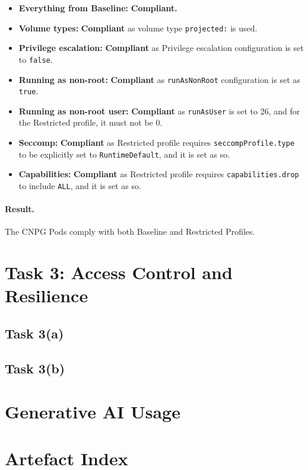 \documentclass[11pt,a4paper]{article}
\begin{document}
	\begin{itemize}
		\item \textbf{Everything from Baseline:} \textbf{Compliant.}

		\item \textbf{Volume types:} \textbf{Compliant} as volume type \texttt{projected:} is used. 
		
		\item \textbf{Privilege escalation:} \textbf{Compliant} as Privilege escalation configuration is set to \texttt{false}. 
		
		\item \textbf{Running as non-root:} \textbf{Compliant} as \texttt{runAsNonRoot} configuration is set as \texttt{true}.
		
		\item \textbf{Running as non-root user:} \textbf{Compliant} as \texttt{runAsUser} is set to 26, and for the Restricted profile, it must not be 0.
		
		\item \textbf{Seccomp:} \textbf{Compliant} as Restricted profile requires \texttt{seccompProfile.type} to be explicitly set to \texttt{RuntimeDefault}, and it is set as so. 
		
		\item \textbf{Capabilities:} \textbf{Compliant} as Restricted profile requires \texttt{capabilities.drop} to include \texttt{ALL}, and it is set as so.
	\end{itemize}
	
	\paragraph{Result.}
	The CNPG Pods comply with both Baseline and Restricted Profiles. 
		
	
	\section{Task 3: Access Control and Resilience}
	
	\subsection{Task 3(a)}
	
	\subsection{Task 3(b)}
	
	\section{Generative AI Usage}
	
	\section{Artefact Index}
	
\end{document}
